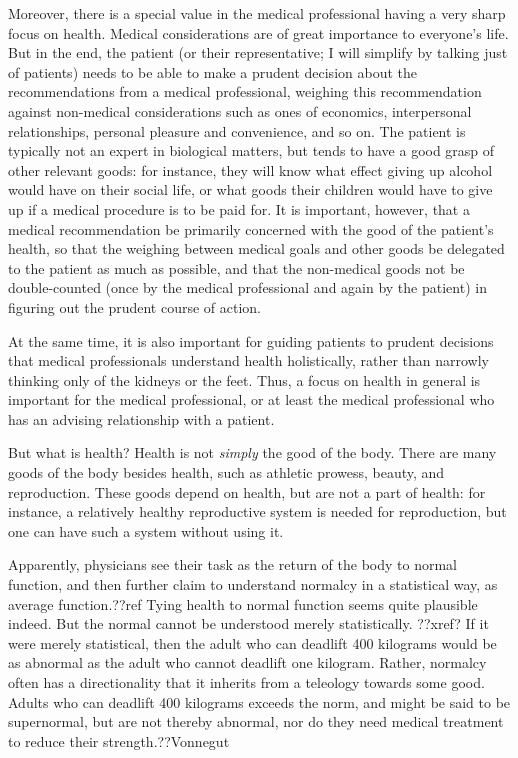 Moreover, there is a special value in the medical professional
having a very sharp focus on health. Medical considerations are of great importance to everyone's life. But in
the end, the patient (or their representative; I will simplify by talking just of patients) needs to be able to make a prudent decision about the recommendations
from a medical professional, weighing this recommendation against non-medical considerations such as ones of economics, interpersonal relationships, personal
pleasure and convenience, and so on. The patient is typically not an expert in biological matters, but tends to have a good grasp of other relevant goods:
for instance, they will know what effect giving up alcohol would have on their social life, or what goods their children would have to give up if a medical
procedure is to be paid for. It is important, however, that a medical recommendation be primarily concerned with the good of the patient's health, so that
the weighing between medical goals and other goods be delegated to the patient as much as possible, and that the non-medical goods not be double-counted (once by the
medical professional and again by the patient) in figuring out the prudent course of action.

At the same time, it is also important for guiding patients to prudent
decisions that medical professionals understand health holistically, rather than narrowly thinking only of the kidneys or the feet. Thus, a focus on health in general
is important for the medical professional, or at least the medical professional who has an advising relationship with a patient.

But what is health? Health is not \textit{simply} the good of the body. There are many goods of the body besides health, such as
athletic prowess, beauty, and reproduction. These goods depend on health, but are not a part of health: for instance, a relatively healthy reproductive system is needed for
reproduction, but one can have such a system without using it.

Apparently, physicians see their task as the return of the body to normal function, and then further claim to understand normalcy in a statistical way, as average
function.??ref Tying health to normal function seems quite plausible indeed. But the normal cannot be understood merely statistically. ??xref? If it were merely
statistical, then the adult who can deadlift 400 kilograms would be as abnormal
as the adult who cannot deadlift one kilogram. Rather, normalcy often has a directionality that it inherits from a teleology towards some good. Adults who
can deadlift 400 kilograms exceeds the norm, and might be said to be supernormal, but are not thereby abnormal, nor do they need medical treatment to reduce their
strength.??Vonnegut


